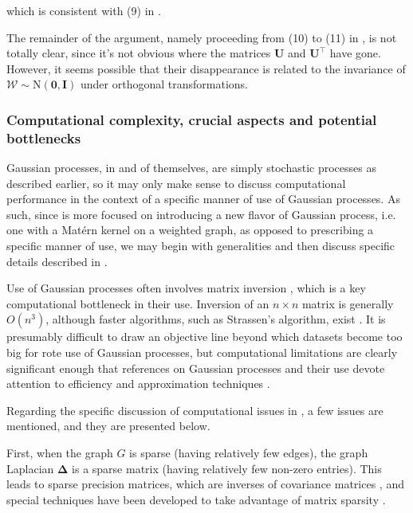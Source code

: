 which is consistent with (9) in \cite{pmlr-v130-borovitskiy21a}.

The remainder of the argument, namely proceeding from (10) to (11) in \cite{pmlr-v130-borovitskiy21a}, is not totally clear, since it's not obvious where the matrices $\mathbf U$ and $\mathbf U^\intercal$ have gone. However, it seems possible that their disappearance is related to the invariance of $\bm{\mathcal W} \sim \mathrm N(\mathbf 0, \mathbf I)$ under orthogonal transformations.

\subsubsection{Computational complexity, crucial aspects and potential bottlenecks}

Gaussian processes, in and of themselves, are simply stochastic processes as described earlier, so it may only make sense to discuss computational performance in the context of a specific manner of use of Gaussian processes. As such, since \cite{pmlr-v130-borovitskiy21a} is more focused on introducing a new flavor of Gaussian process, i.e. one with a Mat\'{e}rn kernel on a weighted graph, as opposed to prescribing a specific manner of use, we may begin with generalities and then discuss specific details described in \cite{pmlr-v130-borovitskiy21a}.

Use of Gaussian processes often involves matrix inversion \cite{banerjee2013efficient, liu2020gaussian}, which is a key computational bottleneck in their use. Inversion of an $n \times n$ matrix is generally $O(n^3)$, although faster algorithms, such as Strassen's algorithm, exist \cite{clrs}. It is presumably difficult to draw an objective line beyond which datasets become too big for rote use of Gaussian processes, but computational limitations are clearly significant enough that references on Gaussian processes and their use devote attention to efficiency and approximation techniques \cite{rw,garnett_bayesoptbook_2023}.

Regarding the specific discussion of computational issues in \cite{pmlr-v130-borovitskiy21a}, a few issues are mentioned, and they are presented below.

First, when the graph $G$ is sparse (having relatively few edges), the graph Laplacian $\bm \Delta$ is a sparse matrix (having relatively few non-zero entries). This leads to sparse precision matrices, which are inverses of covariance matrices \cite{garnett_bayesoptbook_2023}, and special techniques have been developed to take advantage of matrix sparsity \cite{golubvanloan}.

